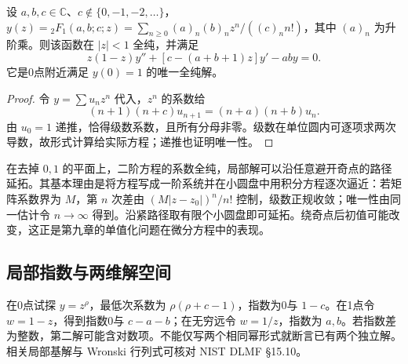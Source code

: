 \begin{proposition}[微分方程]\label{b3:prop:F-hypergeometric-equation}
设 \(a,b,c\in\mathbb C\)、\(c\notin\{0,-1,-2,\ldots\}\)，\(y(z)={}_2F_1(a,b;c;z)=\sum_{n\ge0}(a)_n(b)_n z^n/((c)_n n!)\)，其中 \((a)_n\) 为升阶乘。则该函数在 \(|z|<1\) 全纯，并满足
\begin{equation}\label{b3:eq:F-hypergeometric}
 z(1-z)y''+[c-(a+b+1)z]y'-aby=0.
\end{equation}
它是0点附近满足 \(y(0)=1\) 的唯一全纯解。
\end{proposition}
\begin{proof}
令 \(y=\sum u_nz^n\) 代入，\(z^n\) 的系数给
\[
 (n+1)(n+c)u_{n+1}=(n+a)(n+b)u_n.
\]
由 \(u_0=1\) 递推，恰得级数系数，且所有分母非零。级数在单位圆内可逐项求两次导数，故形式计算给实际方程；递推也证明唯一性。
\end{proof}
在去掉 \(0,1\) 的平面上，二阶方程的系数全纯，局部解可以沿任意避开奇点的路径延拓。其基本理由是将方程写成一阶系统并在小圆盘中用积分方程逐次逼近：若矩阵系数界为 \(M\)，第 \(n\) 次差由 \((M|z-z_0|)^n/n!\) 控制，级数正规收敛；唯一性由同一估计令 \(n\to\infty\) 得到。沿紧路径取有限个小圆盘即可延拓。绕奇点后初值可能改变，这正是第九章的单值化问题在微分方程中的表现。
\ProseParagraphBreak
\subsection{局部指数与两维解空间}
\label{b3:subsec:F0203}

在0点试探 \(y=z^\rho\)，最低次系数为 \(\rho(\rho+c-1)\)，指数为0与 \(1-c\)。在1点令 \(w=1-z\)，得到指数0与 \(c-a-b\)；在无穷远令 \(w=1/z\)，指数为 \(a,b\)。若指数差为整数，第二解可能含对数项。不能仅写两个相同幂形式就断言已有两个独立解。相关局部基解与 Wronski 行列式可核对 NIST DLMF §15.10\cite{NationalInstituteofStandardsNIST}。

